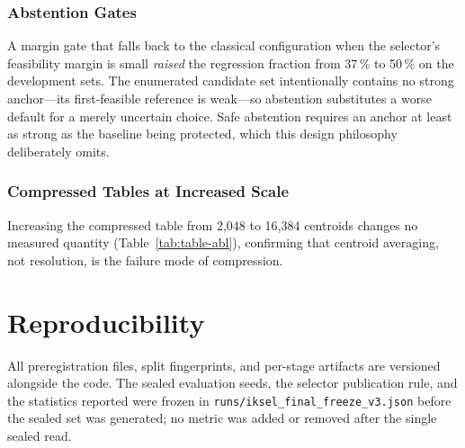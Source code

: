 \documentclass[journal]{IEEEtran}
\begin{document}
\subsubsection*{Abstention Gates}
A margin gate that falls back to the classical configuration when the
selector's feasibility margin is small \textit{raised} the regression
fraction from 37\,\% to 50\,\% on the development sets. The enumerated
candidate set intentionally contains no strong anchor---its
first-feasible reference is weak---so abstention substitutes a worse
default for a merely uncertain choice. Safe abstention requires an
anchor at least as strong as the baseline being protected, which this
design philosophy deliberately omits.

\subsubsection*{Compressed Tables at Increased Scale}
Increasing the compressed table from 2{,}048 to 16{,}384 centroids
changes no measured quantity (Table~\ref{tab:table-abl}), confirming
that centroid averaging, not resolution, is the failure mode of
compression.

\section{Reproducibility}
All preregistration files, split fingerprints, and per-stage artifacts
are versioned alongside the code. The sealed evaluation seeds, the
selector publication rule, and the statistics reported were frozen in
\texttt{runs/iksel\_final\_freeze\_v3.json} before the sealed set was
generated; no metric was added or removed after the single sealed read.



\end{document}
